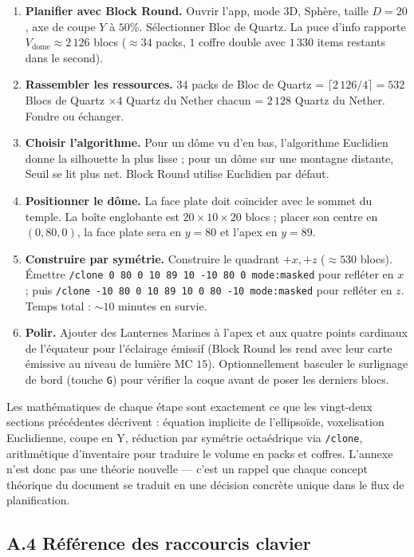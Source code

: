 \documentclass[12pt,a4paper]{scrartcl}
\newcommand{\code}[1]{\texttt{\small #1}}
\newcommand{\cmd}[1]{\textcolor{earth}{\texttt{\small #1}}}
\begin{document}
\begin{enumerate}[leftmargin=1.6em,itemsep=0.3em,topsep=0.3em]
  \item \textbf{Planifier avec Block Round.} Ouvrir l'app, mode 3D, Sphère, taille $D=20$, axe de coupe $Y$ à $50\%$. Sélectionner Bloc de Quartz. La puce d'info rapporte $V_{\mathrm{dome}} \approx 2\,126$ blocs ($\approx 34$ packs, $1$ coffre double avec $1\,330$ items restants dans le second).
  \item \textbf{Rassembler les ressources.} $34$ packs de Bloc de Quartz = $\lceil 2\,126/4 \rceil = 532$ Blocs de Quartz $\times 4$ Quartz du Nether chacun = $2\,128$ Quartz du Nether. Fondre ou échanger.
  \item \textbf{Choisir l'algorithme.} Pour un dôme vu d'en bas, l'algorithme Euclidien donne la silhouette la plus lisse ; pour un dôme sur une montagne distante, Seuil se lit plus net. Block Round utilise Euclidien par défaut.
  \item \textbf{Positionner le dôme.} La face plate doit coïncider avec le sommet du temple. La boîte englobante est $20 \times 10 \times 20$ blocs ; placer son centre en $(0,80,0)$, la face plate sera en $y=80$ et l'apex en $y=89$.
  \item \textbf{Construire par symétrie.} Construire le quadrant $+x, +z$ ($\approx 530$ blocs). Émettre \cmd{/clone 0 80 0 10 89 10 -10 80 0 mode:masked} pour refléter en $x$ ; puis \cmd{/clone -10 80 0 10 89 10 0 80 -10 mode:masked} pour refléter en $z$. Temps total : $\sim 10$ minutes en survie.
  \item \textbf{Polir.} Ajouter des Lanternes Marines à l'apex et aux quatre points cardinaux de l'équateur pour l'éclairage émissif (Block Round les rend avec leur carte émissive au niveau de lumière MC $15$). Optionnellement basculer le surlignage de bord (touche \code{G}) pour vérifier la coque avant de poser les derniers blocs.
\end{enumerate}

Les mathématiques de chaque étape sont exactement ce que les vingt-deux sections précédentes décrivent : équation implicite de l'ellipsoïde, voxelisation Euclidienne, coupe en Y, réduction par symétrie octaédrique via \cmd{/clone}, arithmétique d'inventaire pour traduire le volume en packs et coffres. L'annexe n'est donc pas une théorie nouvelle --- c'est un rappel que chaque concept théorique du document se traduit en une décision concrète unique dans le flux de planification.

\subsection*{A.4 Référence des raccourcis clavier}
\end{document}
